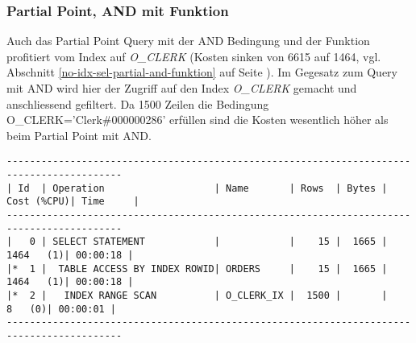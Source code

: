 \documentclass[11pt,a4paper,parskip=half]{scrartcl}
\begin{document}
\subsubsection{Partial Point, AND mit Funktion}
Auch das Partial Point Query mit der AND Bedingung und der Funktion profitiert vom  Index auf \emph{O\_CLERK} (Kosten sinken von 6615 auf 1464, vgl. Abschnitt \ref{no-idx-sel-partial-and-funktion} auf Seite \pageref{no-idx-sel-partial-and-funktion}). Im Gegesatz zum Query mit AND wird hier der Zugriff auf den Index \emph{O\_CLERK} gemacht und anschliessend gefiltert. Da 1500 Zeilen die Bedingung O\_CLERK='Clerk\#000000286' erfüllen sind die Kosten wesentlich höher als beim Partial Point mit AND.
\begin{lstlisting}
------------------------------------------------------------------------------------------                                                                                                                                                                                                                   
| Id  | Operation                   | Name       | Rows  | Bytes | Cost (%CPU)| Time     |                                                                                                                                                                                                                   
------------------------------------------------------------------------------------------                                                                                                                                                                                                                   
|   0 | SELECT STATEMENT            |            |    15 |  1665 |  1464   (1)| 00:00:18 |                                                                                                                                                                                                                   
|*  1 |  TABLE ACCESS BY INDEX ROWID| ORDERS     |    15 |  1665 |  1464   (1)| 00:00:18 |                                                                                                                                                                                                                   
|*  2 |   INDEX RANGE SCAN          | O_CLERK_IX |  1500 |       |     8   (0)| 00:00:01 |                                                                                                                                                                                                                   
------------------------------------------------------------------------------------------                                                                                                                                                                                                                   
                                                                                                                                                                                                                                                                                                             

\end{lstlisting}
\end{document}
